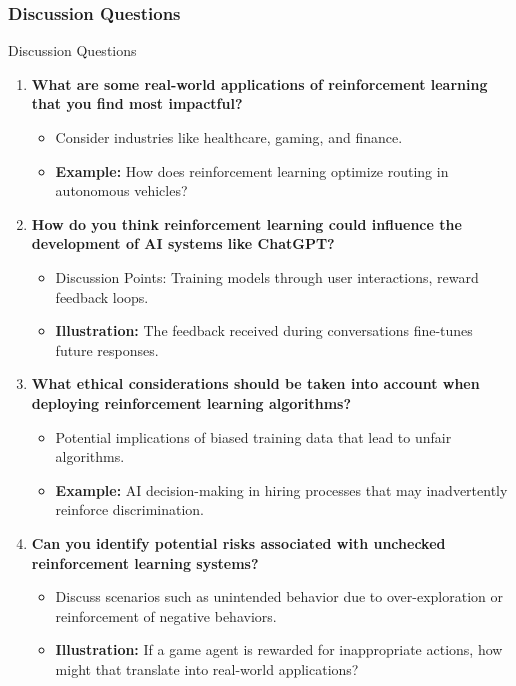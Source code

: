 \documentclass[aspectratio=169]{beamer}
\begin{document}
\begin{frame}[fragile]
  \frametitle{Discussion Questions}
  \begin{block}{Discussion Questions}
    \begin{enumerate}
      \item \textbf{What are some real-world applications of reinforcement learning that you find most impactful?}
        \begin{itemize}
          \item Consider industries like healthcare, gaming, and finance.
          \item \textbf{Example:} How does reinforcement learning optimize routing in autonomous vehicles?
        \end{itemize}
      
      \item \textbf{How do you think reinforcement learning could influence the development of AI systems like ChatGPT?}
        \begin{itemize}
          \item Discussion Points: Training models through user interactions, reward feedback loops.
          \item \textbf{Illustration:} The feedback received during conversations fine-tunes future responses.
        \end{itemize}
      
      \item \textbf{What ethical considerations should be taken into account when deploying reinforcement learning algorithms?}
        \begin{itemize}
          \item Potential implications of biased training data that lead to unfair algorithms.
          \item \textbf{Example:} AI decision-making in hiring processes that may inadvertently reinforce discrimination.
        \end{itemize}
      
      \item \textbf{Can you identify potential risks associated with unchecked reinforcement learning systems?}
        \begin{itemize}
          \item Discuss scenarios such as unintended behavior due to over-exploration or reinforcement of negative behaviors.
          \item \textbf{Illustration:} If a game agent is rewarded for inappropriate actions, how might that translate into real-world applications?
        \end{itemize}
      

\end{enumerate}
\end{block}
\end{frame}
\end{document}
